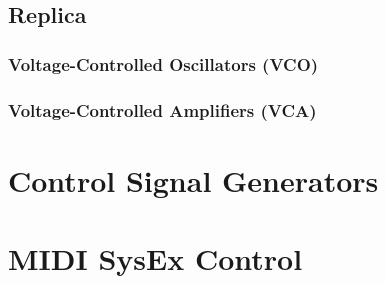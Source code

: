 \documentclass[a4paper]{article}
\begin{document}
\subsection{Replica}
\subsubsection{Voltage-Controlled Oscillators (VCO)}

\subsubsection{Voltage-Controlled Amplifiers (VCA)}


\section{Control Signal Generators}


\section{MIDI SysEx Control}


{}


\end{document}
